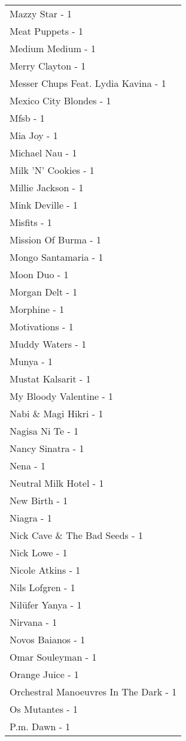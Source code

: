 \documentclass[
]{article}
\begin{document}
\begin{longtable}{l}
Mazzy Star - 1 \\ 
Meat Puppets - 1 \\ 
Medium Medium - 1 \\ 
Merry Clayton - 1 \\ 
Messer Chups Feat. Lydia Kavina - 1 \\ 
Mexico City Blondes - 1 \\ 
Mfsb - 1 \\ 
Mia Joy - 1 \\ 
Michael Nau - 1 \\ 
Milk 'N' Cookies - 1 \\ 
Millie Jackson - 1 \\ 
Mink Deville - 1 \\ 
Misfits - 1 \\ 
Mission Of Burma - 1 \\ 
Mongo Santamaria - 1 \\ 
Moon Duo - 1 \\ 
Morgan Delt - 1 \\ 
Morphine - 1 \\ 
Motivations - 1 \\ 
Muddy Waters - 1 \\ 
Munya - 1 \\ 
Mustat Kalsarit - 1 \\ 
My Bloody Valentine - 1 \\ 
Nabi \& Magi Hikri - 1 \\ 
Nagisa Ni Te - 1 \\ 
Nancy Sinatra - 1 \\ 
Nena - 1 \\ 
Neutral Milk Hotel - 1 \\ 
New Birth - 1 \\ 
Niagra - 1 \\ 
Nick Cave \& The Bad Seeds - 1 \\ 
Nick Lowe - 1 \\ 
Nicole Atkins - 1 \\ 
Nils Lofgren - 1 \\ 
Nilüfer Yanya - 1 \\ 
Nirvana - 1 \\ 
Novos Baianos - 1 \\ 
Omar Souleyman - 1 \\ 
Orange Juice - 1 \\ 
Orchestral Manoeuvres In The Dark - 1 \\ 
Os Mutantes - 1 \\ 
P.m. Dawn - 1 \\ 

\end{longtable}
\end{document}
